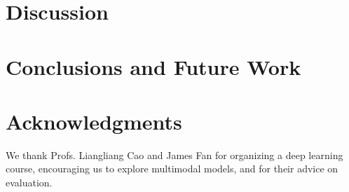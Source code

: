 \documentclass[11pt]{article}
\begin{document}
\section{Discussion}

\section{Conclusions and Future Work}

\section*{Acknowledgments}

We thank Profs. Liangliang Cao and James Fan for organizing a deep learning course, encouraging us to explore multimodal models, and for their advice on evaluation.




\end{document}
